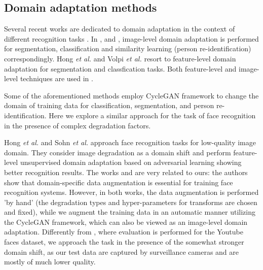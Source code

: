 \subsection{Domain adaptation methods}

Several recent works are dedicated to domain adaptation in the context of different recognition tasks \cite{Volpi_2018_CVPR,Hong_2018_CVPR,Deng_2018_CVPR,Bousmalis_2017_CVPR,Murez_2018_CVPR}. In \cite{Murez_2018_CVPR}, 
\cite{Bousmalis_2017_CVPR} and \cite{Deng_2018_CVPR}, image-level domain adaptation is performed for segmentation, classification and similarity learning (person re-identification) correspondingly. Hong \textit{et al.} \cite{Hong_2018_CVPR} and Volpi \textit{et al.} \cite{Volpi_2018_CVPR} resort to feature-level domain adaptation for segmentation and classfication tasks. Both feature-level and image-level techniques are used in \cite{Hoffman17}.

Some of the aforementioned methods \cite{Hoffman17,Deng_2018_CVPR,Murez_2018_CVPR} employ CycleGAN framework  to change the domain of training data for classification, segmentation, and person re-identification. Here we explore a similar approach for the task of face recognition in the presence of complex degradation factors.

Hong \textit{et al.} \cite{HongIRY17} and
Sohn \textit{et al.} \cite{SohnLZY0C17} approach face recognition tasks for low-quality image domain. They consider image degradation as a domain shift and perform feature-level unsupervised domain adaptation based on adversarial learning showing better recognition results. 
The works \cite{HongIRY17} and \cite{SohnLZY0C17} are very related to ours: the authors show that domain-specific data augmentation is essential for training face recognition systems. 
 However, in both works, the data augmentation is performed 'by hand' (the degradation types and hyper-parameters for transforms are chosen and fixed), while we augment the training data in an automatic manner utilizing the CycleGAN framework, which can also be viewed as an image-level domain adaptation.
Differently from \cite{SohnLZY0C17}, where evaluation is performed for the Youtube faces dataset, we approach the task in the presence of the somewhat stronger domain shift, as our test data are captured by surveillance cameras and are mostly of much lower quality.




